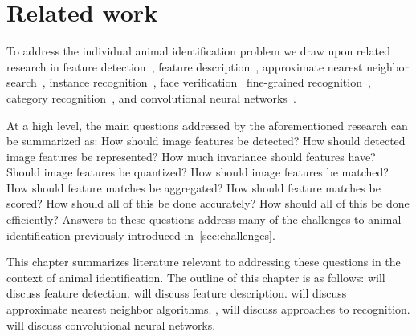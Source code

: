 \begin{comment}
    ./texfix.py --fixcap --dryrun
    ./texfix.py --findcite --unused-important
    ./texfix.py --findcite --close-keys
    fixtex --fpaths chapter2-related-work.tex --outline --asmarkdown --numlines=999 --shortcite -w && ./checklang.py outline_chapter2-related-work.md
\end{comment}

\chapter{Related work}\label{chap:relatedwork} 

    To address the individual animal identification problem we draw upon related research in %
    feature detection~\cite{mikolajczyk_comparison_2005,tuytelaars_local_2007, perdoch_efficient_2009}, %
    feature description~\cite{lowe_distinctive_2004, mikolajczyk_performance_2005,simonyan_learning_2014,
      winder_picking_2009,zagoruyko_learning_2015,han_matchnet_2015}, %
    approximate nearest neighbor search~\cite{silpa_anan_optimised_2008, muja_fast_2009}, %
    instance recognition~\cite{sivic_efficient_2009,nister_scalable_2006,
      philbin_object_2007,jegou_hamming_2008,bo_efficient_2009, jegou_aggregating_2012, tolias_aggregate_2013}, %
    face verification~\cite{chopra_learning_2005,huang_labeled_2007,berg_tom_vs_pete_2012,
      chen_blessing_2013,taigman_deepface_2014} %
    fine-grained recognition~\cite{parkhi_cats_2012,berg_poof_2013, gavves_local_2014}, %
    category recognition~\cite{lazebnik_beyond_2006,zhang_local_2006,
      mccann_local_2012,boiman_defense_2008,sanchez_compressed_2013}, %
    and convolutional neural networks~\cite{krizhevsky_imagenet_2012, razavian_cnn_2014,
      zagoruyko_learning_2015,han_matchnet_2015,arandjelovic_netvlad_2016}.

    At a high level, the main questions addressed by the aforementioned research can be summarized as: How should image
    features be detected? How should detected image features be represented? How much invariance should features
    have? Should image features be quantized? How should image features be matched? How should feature matches be
    aggregated? How should feature matches be scored? How should all of this be done accurately? How should all of
    this be done efficiently? Answers to these questions address many of the challenges to animal identification
    previously introduced in~\cref{sec:challenges}.

    This chapter summarizes literature relevant to addressing these questions in the context of animal
    identification. The outline of this chapter is as follows:  will discuss feature
    detection.  will discuss feature description.  will discuss approximate
    nearest neighbor algorithms. , will discuss approaches to recognition.
     will discuss convolutional neural networks.


